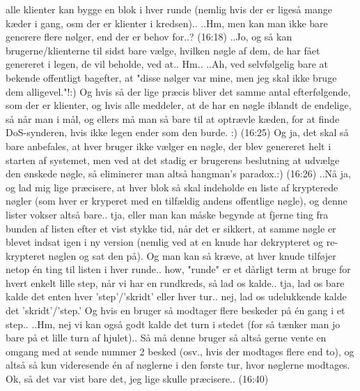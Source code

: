 \documentclass{article}
\begin{document}
alle klienter kan bygge en blok i hver runde (nemlig hvis der er ligeså mange kæder i gang, osm der er klienter i kredsen).. ..Hm, men kan man ikke bare generere flere nølger, end der er behov for..? (16:18) ..Jo, og så kan brugerne/klienterne til sidst bare vælge, hvilken nøgle af dem, de har fået genereret i legen, de vil beholde, ved at.. Hm.. ..Ah, ved selvfølgelig bare at bekende offentligt bagefter, at "disse nølger var mine, men jeg skal ikke bruge dem alligevel."!:) Og hvis så der lige præcis bliver det samme antal efterfølgende, som der er klienter, og hvis alle meddeler, at de har en nøgle iblandt de endelige, så når man i mål, og ellers må man så bare til at optrævle kæden, for at finde DoS-synderen, hvis ikke legen ender som den burde. :) (16:25) Og ja, det skal så bare anbefales, at hver bruger ikke vælger en nøgle, der blev genereret helt i starten af systemet, men ved at det stadig er brugerens beslutning at udvælge den ønskede nøgle, så eliminerer man altså hangman's paradox.:) (16:26) ..Nå ja, og lad mig lige præcisere, at hver blok så skal indeholde en liste af krypterede nøgler (som hver er kryperet med en tilfældig andens offentlige nøgle), og denne lister vokser altså bare.. tja, eller man kan måske begynde at fjerne ting fra bunden af listen efter et vist stykke tid, når det er sikkert, at samme nøgle er blevet indsat igen i ny version (nemlig ved at en knude har dekrypteret og re-krypteret nøglen og sat den på). Og man kan så kræve, at hver knude tilføjer netop én ting til listen i hver runde.. how, "runde" er et dårligt term at bruge for hvert enkelt lille step, når vi har en rundkreds, så lad os kalde.. tja, lad os bare kalde det enten hver 'step'/'skridt' eller hver tur.. nej, lad os udelukkende kalde det 'skridt'/'step.' Og hvis en bruger så modtager flere beskeder på én gang i et step.. ..Hm, nej vi kan også godt kalde det turn i stedet (for så tænker man jo bare på et lille turn af hjulet).. Så må denne bruger så altså gerne vente en omgang med at sende nummer 2 besked (osv., hvis der modtages flere end to), og altså så kun videresende én af nøglerne i den første tur, hvor nøglerne modtages. Ok, så det var vist bare det, jeg lige skulle præcisere.. (16:40)
%
\end{document}
